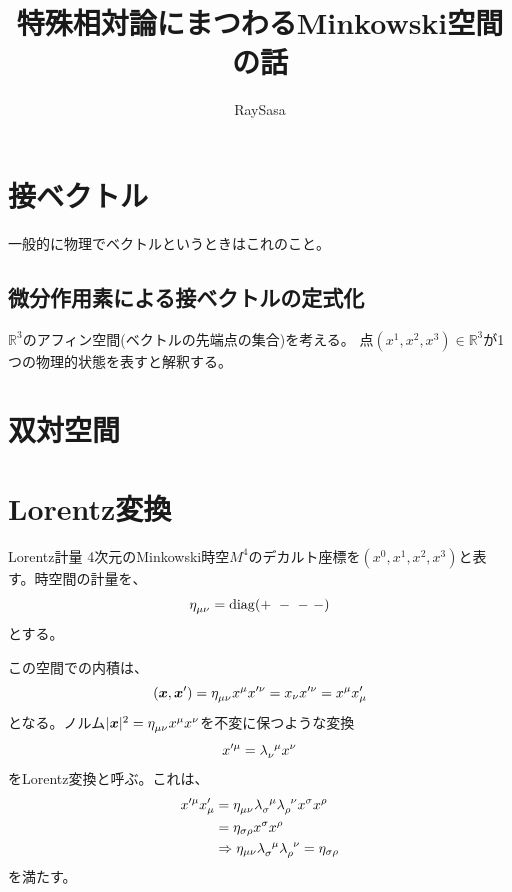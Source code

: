 \documentclass[11pt,titlepage]{ltjsarticle}
\title{特殊相対論にまつわるMinkowski空間の話}
\author{RaySasa}
\date{}
\begin{document}
\maketitle
\tableofcontents
\clearpage

\section{接ベクトル}
一般的に物理でベクトルというときはこれのこと。
\subsection{微分作用素による接ベクトルの定式化}
$\mathbb{R}^3$のアフィン空間(ベクトルの先端点の集合)を考える。
点$(x^1,x^2,x^3)\in\mathbb{R}^3$が1つの物理的状態を表すと解釈する。

\section{双対空間}
\section{Lorentz変換}
\begin{itembox}[l]{Lorentz計量}
    4次元のMinkowski時空$M^4$のデカルト座標を$(x^0,x^1,x^2,x^3)$と表す。時空間の計量を、
    \begin{equation}
        \tensor{\eta}{_{\mu\nu}}=\mathrm{diag}(+\ -\ -\ -)
    \end{equation}
    とする。
\end{itembox}
この空間での内積は、
\begin{equation}
    (\bm{x},\bm{x}^{\prime})=\tensor{\eta}{_{\mu\nu}}x^{\mu}x^{\prime\nu}=x_{\nu}x^{\prime\nu}=x^{\mu}{x}^{\prime}_\mu
\end{equation}
となる。ノルム$|\bm{x}|^2=\tensor{\eta}{_{\mu\nu}}x^{\mu}x^{\nu}$を不変に保つような変換
\begin{equation}
    x^{\prime\mu}=\tensor{\lambda}{_\nu^\mu}x^{\nu}
\end{equation}
をLorentz変換と呼ぶ。これは、
\begin{align}
    x^{\prime\mu}x^{\prime}_\mu &= \tensor{\eta}{_{\mu\nu}}\tensor{\lambda}{_\sigma^\mu}\tensor{\lambda}{_\rho^\nu}x^{\sigma}x^{\rho}\\
    &= \eta_{\sigma\rho}x^{\sigma}x^{\rho}\\
    &\Rightarrow \eta_{\mu\nu}\tensor{\lambda}{_\sigma^\mu}\tensor{\lambda}{_\rho^\nu} = \eta_{\sigma\rho}
\end{align}
を満たす。
\end{document}
